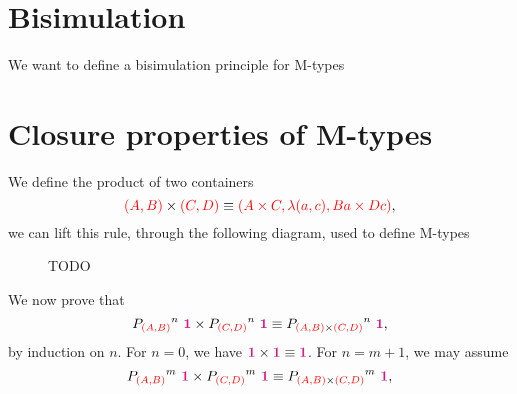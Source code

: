 \documentclass[twoside,11pt,openright]{report}
\newcommand*{\type}[1]{\textcolor{magenta!90!black}{#1}}
\newcommand*{\container}[1]{\textcolor{red}{#1}}
\newcommand*{\unit}{\type{\textbf{1}}}
\begin{document}
\section{Bisimulation}
We want to define a bisimulation principle for M-types

\section{Closure properties of M-types}
We define the product of two containers
\begin{equation}
  \container{(A,B)} \times \container{(C,D)} \equiv \container{( A \times C , \lambda (a , c), B a \times D c)},
\end{equation}
we can lift this rule, through the following diagram, used to define M-types

\begin{figure}[h]
  \centering
  \caption{TODO}
\end{figure}
\noindent We now prove that
\begin{equation}
  {P_{\container{(A,B)}}}^n~\unit \times {P_{\container{(C,D)}}}^n~\unit \equiv {P_{\container{(A,B)} \times \container{(C,D)}}}^n~\unit,
\end{equation}
by induction on \(n\). For \(n = 0\), we have \(\unit \times \unit \equiv \unit\). For \(n = m + 1\), we may assume
\begin{equation}
{P_{\container{(A,B)}}}^m~\unit \times {P_{\container{(C,D)}}}^m~\unit \equiv {P_{\container{(A,B)} \times \container{(C,D)}}}^m~\unit,
\end{equation}
\end{document}

